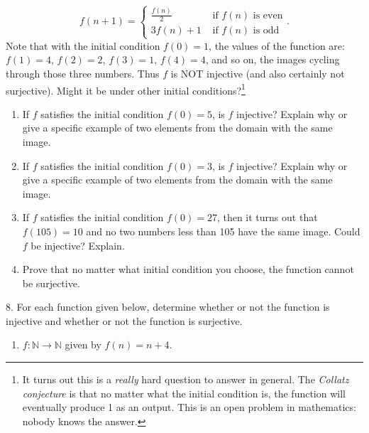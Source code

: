 \documentclass[10pt,]{book}
\theoremstyle{plain}
\theoremstyle{definition}
\theoremstyle{definition}
\numberwithin{equation}{chapter}
\newcommand{\N}{\mathbb N}
\newcommand{\amp}{&}
\begin{document}
\begin{exerciselist}
\begin{equation*}
f(n+1) = \begin{cases} \frac{f(n)}{2} \amp \text{ if } f(n) \text{ is even} \\ 3f(n) + 1 \amp \text{ if } f(n) \text{ is odd}\end{cases}.
\end{equation*}
Note that with the initial condition \(f(0) = 1\), the values of the function are: \(f(1) = 4\), \(f(2) = 2\), \(f(3) = 1\), \(f(4) = 4\), and so on, the images cycling through those three numbers.  Thus \(f\) is NOT injective (and also certainly not surjective).  Might it be under other initial conditions?\footnote{It turns out this is a \emph{really} hard question to answer in general.  The \emph{Collatz conjecture} is that no matter what the initial condition is, the function will eventually produce 1 as an output.  This is an open problem in mathematics: nobody knows the answer.\label{fn-3}}%
\par
\hypertarget{p-710}{}%
\leavevmode%
\begin{enumerate}[label=(\alph*)]
\item\hypertarget{li-451}{}\hypertarget{p-711}{}%
If \(f\) satisfies the initial condition \(f(0) = 5\), is \(f\) injective?  Explain why or give a specific example of two elements from the domain with the same image.%
\item\hypertarget{li-452}{}\hypertarget{p-712}{}%
If \(f\) satisfies the initial condition \(f(0) = 3\), is \(f\) injective?  Explain why or give a specific example of two elements from the domain with the same image.%
\item\hypertarget{li-453}{}\hypertarget{p-713}{}%
If \(f\) satisfies the initial condition \(f(0) = 27\), then it turns out that \(f(105) = 10\) and no two numbers less than 105 have the same image.  Could \(f\) be injective?  Explain.%
\item\hypertarget{li-454}{}\hypertarget{p-714}{}%
Prove that no matter what initial condition you choose, the function cannot be surjective.%
\end{enumerate}
%
\par\smallskip
\item[8.]\hypertarget{exercise-54}{}\hypertarget{p-720}{}%
For each function given below, determine whether or not the function is injective and whether or not the function is surjective. \leavevmode%
\begin{enumerate}[label=(\alph*)]
\item\hypertarget{li-459}{}\(f:\N \to \N\) given by \(f(n) = n+4\).%

\end{enumerate}
\end{exerciselist}
\end{document}
